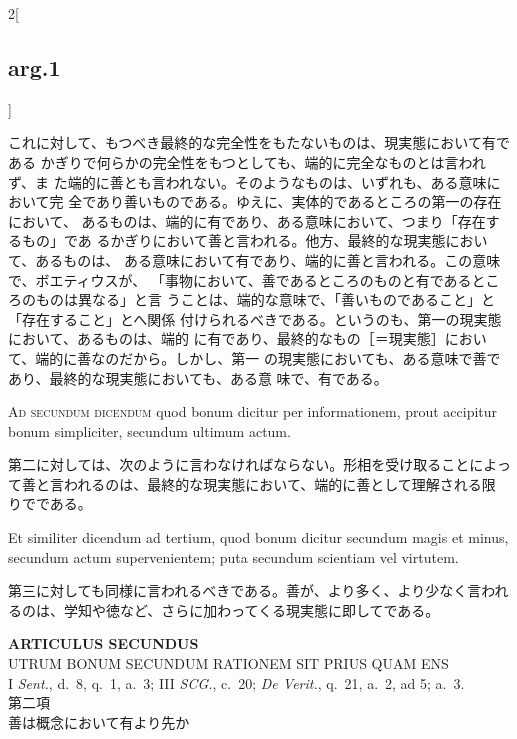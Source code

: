\documentclass[paper=a4paper,fontsize=10pt,jafontsize=9pt,titlepage]{jlreq}
\begin{document}
\begin{paracol}{2}[\subsection{arg.1}]
\switchcolumn

これに対して、もつべき最終的な完全性をもたないものは、現実態において有である
 かぎりで何らかの完全性をもつとしても、端的に完全なものとは言われず、ま
 た端的に善とも言われない。そのようなものは、いずれも、ある意味において完
 全であり善いものである。ゆえに、実体的であるところの第一の存在において、
 あるものは、端的に有であり、ある意味において、つまり「存在するもの」であ
 るかぎりにおいて善と言われる。他方、最終的な現実態において、あるものは、
 ある意味において有であり、端的に善と言われる。この意味で、ボエティウスが、
 「事物において、善であるところのものと有であるところのものは異なる」と言
 うことは、端的な意味で、「善いものであること」と「存在すること」とへ関係
 付けられるべきである。というのも、第一の現実態において、あるものは、端的
 に有であり、最終的なもの［＝現実態］において、端的に善なのだから。しかし、第一
 の現実態においても、ある意味で善であり、最終的な現実態においても、ある意
 味で、有である。

\switchcolumn*[\subsection{ad.2}]

{\scshape Ad secundum dicendum} quod bonum dicitur per informationem,
 prout accipitur bonum simpliciter, secundum ultimum actum.

\switchcolumn

第二に対しては、次のように言わなければならない。形相を受け取ることによっ
 て善と言われるのは、最終的な現実態において、端的に善として理解される限
 りでである。

\switchcolumn*

Et similiter dicendum ad tertium, quod bonum dicitur secundum magis et
 minus, secundum actum supervenientem; puta secundum scientiam vel
 virtutem.

\switchcolumn

第三に対しても同様に言われるべきである。善が、より多く、より少なく言われ
 るのは、学知や徳など、さらに加わってくる現実態に即してである。

\end{paracol}

\newpage
{}
{}
\setcounter{section}{2}
\setcounter{subsection}{0}

\begin{center}
 {\Large {\bfseries ARTICULUS SECUNDUS}}\\
 {\large UTRUM BONUM SECUNDUM RATIONEM SIT PRIUS QUAM ENS}\\
 {\footnotesize I {\itshape Sent.}, d.~8, q.~1, a.~3; III {\itshape
 SCG.}, c.~20; {\itshape De Verit.}, q.~21, a.~2, ad 5; a.~3.}\\
 {\Large 第二項\\善は概念において有より先か}
\end{center}
\end{document}
